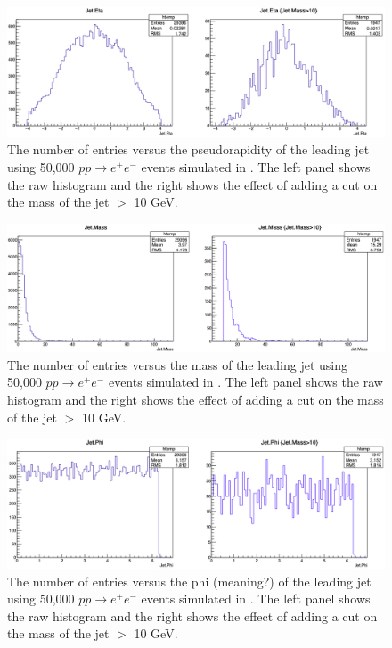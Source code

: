 \begin{figure}[H]
\centering
\includegraphics[width=\textwidth]{./sec10/JetEta.png}
\caption{The number of entries versus the pseudorapidity of the leading jet using 50,000 $pp \rightarrow e^+ e^-$ events simulated in \madgraph. The left panel shows the raw histogram and the right shows the effect of adding a cut on the mass of the jet $>$ 10 GeV.}
\end{figure}

\begin{figure}[H]
\centering
\includegraphics[width=\textwidth]{./sec10/JetMass.png}
\caption{The number of entries versus the mass of the leading jet using 50,000 $pp \rightarrow e^+ e^-$ events simulated in \madgraph. The left panel shows the raw histogram and the right shows the effect of adding a cut on the mass of the jet $>$ 10 GeV.}
\end{figure}

\begin{figure}[H]
\centering
\includegraphics[width=\textwidth]{./sec10/JetPhi.png}
\caption{The number of entries versus the phi (meaning?) of the leading jet using 50,000 $pp \rightarrow e^+ e^-$ events simulated in \madgraph. The left panel shows the raw histogram and the right shows the effect of adding a cut on the mass of the jet $>$ 10 GeV.}
\end{figure}

